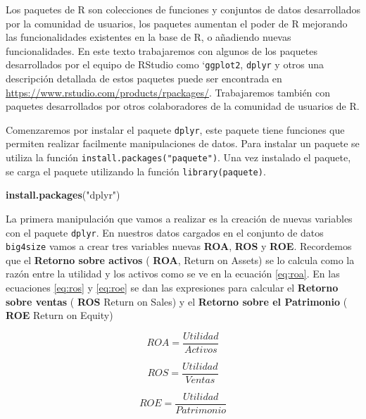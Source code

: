 \documentclass[]{book}
\newenvironment{Shaded}{\begin{snugshade}}{\end{snugshade}}
\newcommand{\KeywordTok}[1]{\textcolor[rgb]{0.13,0.29,0.53}{\textbf{#1}}}
\newcommand{\NormalTok}[1]{#1}
\newcommand{\StringTok}[1]{\textcolor[rgb]{0.31,0.60,0.02}{#1}}
\begin{document}
Los paquetes de R son colecciones de funciones y conjuntos de datos desarrollados por la comunidad de usuarios, los paquetes aumentan el poder de R mejorando las funcionalidades existentes en la base de R, o añadiendo nuevas funcionalidades. En este texto trabajaremos con algunos de los paquetes desarrollados por el equipo de RStudio como `\texttt{ggplot2}, \texttt{dplyr} y otros una descripción detallada de estos paquetes puede ser encontrada en \url{https://www.rstudio.com/products/rpackages/}. Trabajaremos también con paquetes desarrollados por otros colaboradores de la comunidad de usuarios de R.

Comenzaremos por instalar el paquete \texttt{dplyr}, este paquete tiene funciones que permiten realizar facilmente manipulaciones de datos. Para instalar un paquete se utiliza la función \texttt{install.packages("paquete")}. Una vez instalado el paquete, se carga el paquete utilizando la función \texttt{library(paquete)}.

\begin{Shaded}
\begin{Highlighting}[]
\KeywordTok{install.packages}\NormalTok{(}\StringTok{"dplyr"}\NormalTok{)}
\end{Highlighting}
\end{Shaded}

La primera manipulación que vamos a realizar es la creación de nuevas variables con el paquete \texttt{dplyr}. En nuestros datos cargados en el conjunto de datos \texttt{big4size} vamos a crear tres variables nuevas \textbf{ROA}, \textbf{ROS} y \textbf{ROE}. Recordemos que el \textbf{Retorno sobre activos} ( \textbf{ROA}, Return on Assets) se lo calcula como la razón entre la utilidad y los activos como se ve en la ecuación \eqref{eq:roa}. En las ecuaciones \eqref{eq:ros} y \eqref{eq:roe} se dan las expresiones para calcular el \textbf{Retorno sobre ventas} ( \textbf{ROS} Return on Sales) y el \textbf{Retorno sobre el Patrimonio} ( \textbf{ROE} Return on Equity)

\begin{equation} 
  ROA = \dfrac{Utilidad}{Activos}
  \label{eq:roa}
\end{equation}

\begin{equation} 
  ROS = \dfrac{Utilidad}{Ventas}
  \label{eq:ros}
\end{equation}

\begin{equation} 
  ROE = \dfrac{Utilidad}{Patrimonio}
  \label{eq:roe}
\end{equation}
\end{document}
